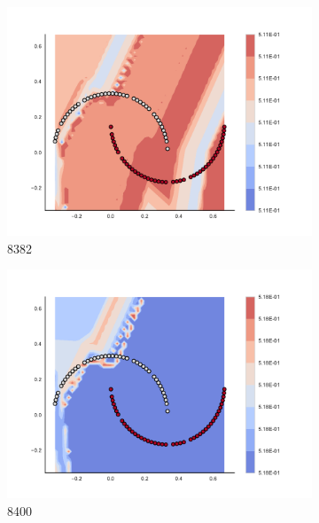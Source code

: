        \begin{figure}[h]\ContinuedFloat
        
\begin{subfigure}[b]{0.09\textwidth}
    \includegraphics[clip, trim=2.35cm 1.75cm 4.5cm 0cm,width=\textwidth]{img/convergence/8382.pdf}
    \caption{8382}
    \label{fig:convergence_8382}
\end{subfigure}
%
\begin{subfigure}[b]{0.09\textwidth}
    \includegraphics[clip, trim=2.35cm 1.75cm 4.5cm 0cm,width=\textwidth]{img/convergence/8400.pdf}
    \caption{8400}
    \label{fig:convergence_8400}
\end{subfigure}
%
\begin{subfigure}[b]{0.09\textwidth}

\end{subfigure}
\end{figure}
